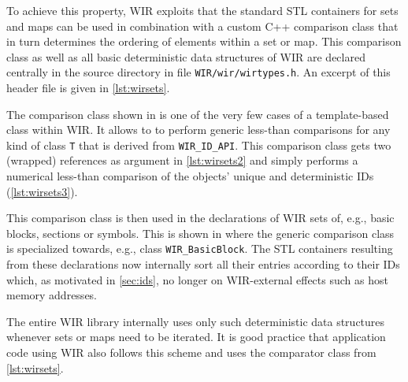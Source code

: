 To achieve this property, \gls{WIR} exploits that the standard \gls{STL} containers for sets and maps can be used in combination with a custom C++ comparison class that in turn determines the ordering of elements within a set or map.
This comparison class as well as all basic deterministic data structures of \gls{WIR} are declared centrally in the source directory in file \texttt{WIR/wir/wirtypes.h}.
An excerpt of this header file is given in \cref{lst:wirsets}.

The comparison class shown in  is one of the very few cases of a template-based class within \gls{WIR}.
It allows to to perform generic less-than comparisons for any kind of class \texttt{T} that is derived from \texttt{WIR\_ID\_API}.
This comparison class gets two (wrapped) references as argument in \cref{lst:wirsets2} and simply performs a numerical less-than comparison of the objects' unique and deterministic IDs (\cref{lst:wirsets3}).

This comparison class is then used in the declarations of \gls{WIR} sets of, e.g., basic blocks, sections or symbols.
This is shown in  where the generic comparison class is specialized towards, e.g., class \texttt{WIR\_BasicBlock}.
The \gls{STL} containers resulting from these declarations now internally sort all their entries according to their IDs which, as motivated in \cref{sec:ids}, no longer on \gls{WIR}-external effects such as host memory addresses.

The entire \gls{WIR} library internally uses only such deterministic data structures whenever sets or maps need to be iterated.
It is good practice that application code using \gls{WIR} also follows this scheme and uses the comparator class from \cref{lst:wirsets}.


\cleardoubleoddpage
